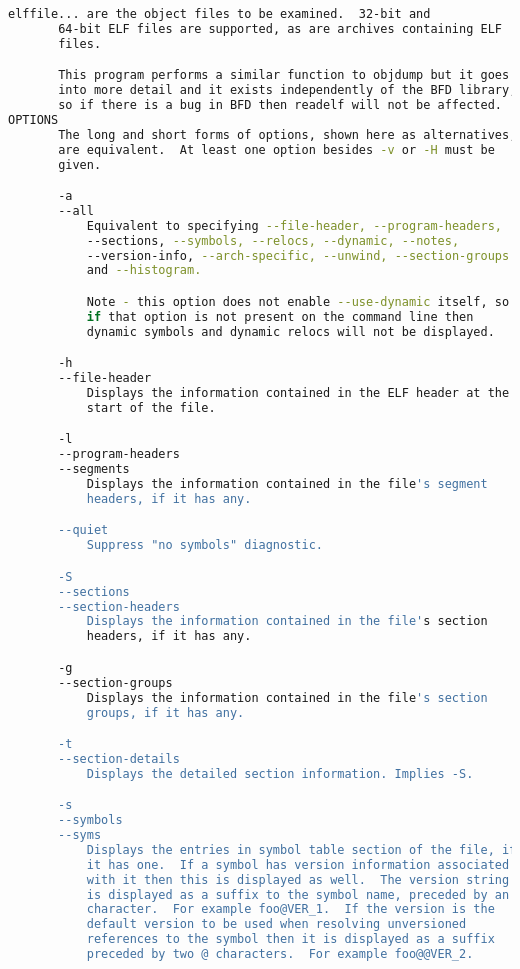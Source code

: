 {{\begin{lstlisting}[language=bash]
       elffile... are the object files to be examined.  32-bit and
       64-bit ELF files are supported, as are archives containing ELF
       files.

       This program performs a similar function to objdump but it goes
       into more detail and it exists independently of the BFD library,
       so if there is a bug in BFD then readelf will not be affected.
OPTIONS
       The long and short forms of options, shown here as alternatives,
       are equivalent.  At least one option besides -v or -H must be
       given.

       -a
       --all
           Equivalent to specifying --file-header, --program-headers,
           --sections, --symbols, --relocs, --dynamic, --notes,
           --version-info, --arch-specific, --unwind, --section-groups
           and --histogram.

           Note - this option does not enable --use-dynamic itself, so
           if that option is not present on the command line then
           dynamic symbols and dynamic relocs will not be displayed.

       -h
       --file-header
           Displays the information contained in the ELF header at the
           start of the file.

       -l
       --program-headers
       --segments
           Displays the information contained in the file's segment
           headers, if it has any.

       --quiet
           Suppress "no symbols" diagnostic.

       -S
       --sections
       --section-headers
           Displays the information contained in the file's section
           headers, if it has any.

       -g
       --section-groups
           Displays the information contained in the file's section
           groups, if it has any.

       -t
       --section-details
           Displays the detailed section information. Implies -S.

       -s
       --symbols
       --syms
           Displays the entries in symbol table section of the file, if
           it has one.  If a symbol has version information associated
           with it then this is displayed as well.  The version string
           is displayed as a suffix to the symbol name, preceded by an @
           character.  For example foo@VER_1.  If the version is the
           default version to be used when resolving unversioned
           references to the symbol then it is displayed as a suffix
           preceded by two @ characters.  For example foo@@VER_2.


\end{lstlisting}}}
